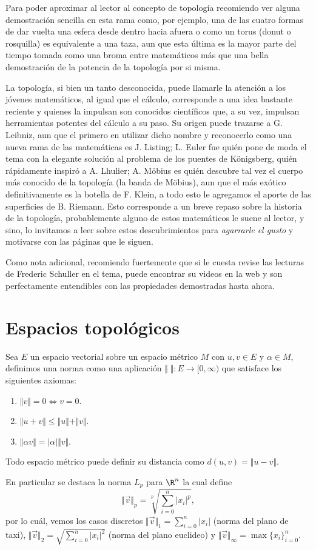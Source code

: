 \documentclass[11pt,oneside,a4paper]{book}
\begin{document}
Para poder aproximar al lector al concepto de topología recomiendo ver alguna demostración sencilla en esta rama como, por ejemplo, una de las cuatro formas de dar vuelta una esfera desde dentro hacia afuera o como un torus (donut o rosquilla) es equivalente a una taza, aun que esta última es la mayor parte del tiempo tomada como una broma entre matemáticos más que una bella demostración de la potencia de la topología por si misma.

La topología, si bien un tanto desconocida, puede llamarle la atención a los jóvenes matemáticos, al igual que el cálculo, corresponde a una idea bastante reciente y quienes la impulsan son conocidos científicos que, a su vez, impulsan herramientas potentes del cálculo a su paso. Su origen puede trazarse a G. Leibniz, aun que el primero en utilizar dicho nombre y reconocerlo como una nueva rama de las matemáticas es J. Listing; L. Euler fue quién pone de moda el tema con la elegante solución al problema de los puentes de Königsberg, quién rápidamente inspiró a A. Lhulier; A. Möbius es quién descubre tal vez el cuerpo más conocido de la topología (la banda de Möbius), aun que el más exótico definitivamente es la botella de F. Klein, a todo esto le agregamos el aporte de las superficies de B. Riemann. Esto corresponde a un breve repaso sobre la historia de la topología, probablemente alguno de estos matemáticos le suene al lector, y sino, lo invitamos a leer sobre estos descubrimientos para \textit{agarrarle el gusto} y motivarse con las páginas que le siguen.

Como nota adicional, recomiendo fuertemente que si le cuesta revise las lecturas de Frederic Schuller en el tema, puede encontrar su videos en la web y son perfectamente entendibles con las propiedades demostradas hasta ahora.

\section{Espacios topológicos}
\begin{mydef}
Sea $E$ un espacio vectorial sobre un espacio métrico $M$ con $u,v\in E$ y $\alpha\in M$, definimos una norma como una aplicación $\Vert\;\Vert:E\rightarrow [0,\infty)$ que satisface los siguientes axiomas:
\begin{enumerate}[(1)]
\item $\Vert v\Vert=0\iff v=0$.
\item $\Vert u+v\Vert\leq\Vert u\Vert+\Vert v\Vert$.
\item $\Vert\alpha v\Vert=|\alpha|\Vert v\Vert$.
\end{enumerate}
Todo espacio métrico puede definir su distancia como $d(u,v)=\Vert u-v\Vert$.
\end{mydef}
En particular se destaca la norma $L_p$ para $\R^n$ la cual define
$$\Vert\vec{v}\Vert_p=\sqrt[p]{\sum_{i=0}^n|x_i|^p},$$
por lo cuál, vemos los casos discretos $\Vert\vec{v}\Vert_1=\sum_{i=0}^n|x_i|$ (norma del plano de taxi), $\Vert\vec{v}\Vert_2=\sqrt{\sum_{i=0}^n|x_i|^2}$ (norma del plano euclideo) y $\Vert\vec{v}\Vert_\infty=\max\{x_i\}_{i=0}^n$.
\end{document}
